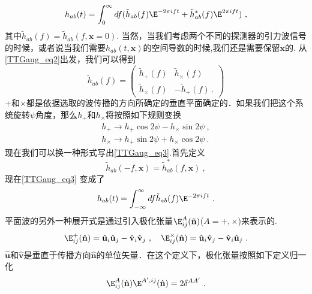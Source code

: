 \begin{equation}\label{TTGaug_eq3}
h_{ab} (t) = \int^\infty_0 df ( \tilde h_{ab} (f) \E^{-2\pi i f t} + \tilde h^*_{ab} (f) \E^{2\pi i f t} ) ~, 
\end{equation}
其中$\tilde h_{ab}(f) = \tilde h_{ab}(f,\mathbf x = 0)$. 当然，当我们考虑两个不同的探测器的引力波信号的时候，或者说当我们需要$h_{ab}(t,\mathbf x)$的空间导数的时候,我们还是需要保留$\mathbf x$的. 从\autoref{TTGaug_eq2}出发，我们可以得到
\begin{equation}
\tilde h_{ab} (f) = 
\begin{pmatrix}
\tilde h_+(f) & \tilde h_{\times} (f) \\
\tilde h_{\times} (f) & -\tilde h_+ (f) ~.
\end{pmatrix}
\end{equation}
$+$和$\times$都是依据选取的波传播的方向所确定的垂直平面确定的．如果我们把这个系统旋转$\psi$角度，那么$h_+$和$h_{\times}$将按照如下规则变换
\begin{equation}
\begin{aligned}
h_+\rightarrow h_+ \cos 2 \psi - h_\times \sin 2 \psi ~, \\
h_\times \rightarrow h_+ \sin 2 \psi + h_\times \cos 2\psi ~.
\end{aligned}
\end{equation}
现在我们可以换一种形式写出\autoref{TTGaug_eq3}.首先定义
\begin{equation}
\tilde h_{ab} (-f,\mathbf x) = \tilde h^*_{ab} (f,\mathbf x) ~,
\end{equation}
现在\autoref{TTGaug_eq3} 变成了
\begin{equation}
h_{ab} (t) = \int_{-\infty}^{\infty} df \tilde h_{ab} (f) \E^{-2\pi i f t}~. 
\end{equation}
平面波的另外一种展开式是通过引入极化张量$\E^A_{ij}(\hat{ {\mathbf n} })$($A = +,\times$)来表示的. 
\begin{equation}
\E^+_{ij} (\hat{ {\mathbf n} }) = \hat{{\mathbf u} }_i \hat{{\mathbf u} }_j - \hat{{\mathbf v} }_i \hat{{\mathbf v} }_j~, \quad \E^\times_{ij} (\hat{ {\mathbf n} }) = \hat{{\mathbf u} }_i \hat{{\mathbf v} }_j - \hat{{\mathbf v} }_i \hat{{\mathbf u} }_j ~.
\end{equation}
$\hat{ {\mathbf u} }$和$\hat{ {\mathbf v} }$是垂直于传播方向$\hat{  {\mathbf n}  }$的单位矢量．在这个定义下，极化张量按照如下定义归一化
\begin{equation}
\E^A_{ij}(\hat{ {\mathbf n} }) \E^{A',ij} (\hat{ {\mathbf n} }) = 2 \delta^{AA'} ~.  
\end{equation}
